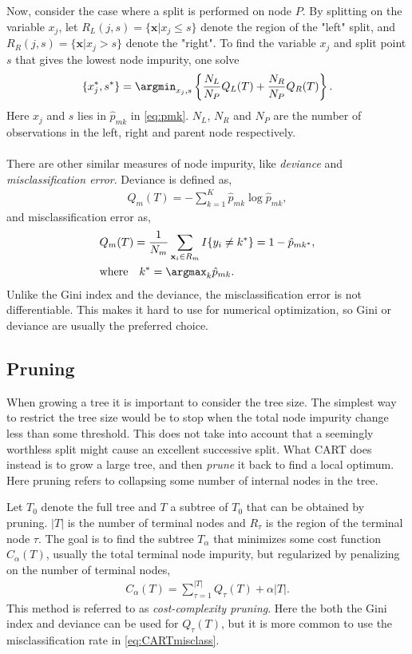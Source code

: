Now, consider the case where a split is performed on node $P$. By splitting on the variable $x_j$, let $R_L(j,s) = \{\mathbf{x} | x_j \leq s\}$ denote the region of the "left" split,  and $R_R(j,s) = \{\mathbf{x} | x_j > s\}$ denote the "right". To find the variable $x_j$ and split point $s$ that gives the lowest node impurity, one solve
\begin{align}
  \{x_j^*, s^*\} = \argmin_{x_j,s} \left\{ \frac{N_L}{N_P} Q_L(T)
  + \frac{N_R}{N_P} Q_R(T) \right\}.
\end{align}
Here $x_j$ and $s$ lies in $\hat{p}_{mk}$ in \eqref{eq:pmk}. $N_L$, $N_R$ and $N_P$ are the number of observations in the left, right and parent node respectively.
\\
\\
There are other similar measures of node impurity, like \textit{deviance} and \textit{misclassification error}. Deviance is defined as,
\begin{align}
  Q_m(T) = -  \sum^{K}_{k=1} \hat p_{m k} \log \hat p_{m k},
\end{align}
and misclassification error as,
\begin{align}
  \label{eq:CARTmisclass} 
  &Q_m(T) = \frac{1}{N_m} \sum_{\mathbf{x}_i \in R_m} I\{y_i \neq k^*\} = 1 - \hat p_{m k^*},\\
  &\text{where} \quad k^* = \argmax_k \hat p_{m k}. \notag
\end{align}
Unlike the Gini index and the deviance, the misclassification error is not differentiable. This makes it hard to use for numerical optimization, so Gini or deviance are usually the preferred choice. 

\subsection{Pruning}
\label{sub:Pruning}

When growing a tree it is important to consider the tree size. The simplest way to restrict the tree size would be to stop when the total node impurity change less than some threshold. This does not take into account that a seemingly worthless split might cause an excellent successive split. 
What CART does instead is to grow a large tree, and then \textit{prune} it back to find a local optimum. Here pruning refers to collapsing some number of internal nodes in the tree. 

Let $T_0$ denote the full tree and $T$ a subtree of $T_0$ that can be obtained by pruning. $|T|$ is the number of terminal nodes and $R_{\tau}$ is the region of the terminal node $\tau$. The goal is to find the subtree $T_\alpha$ that minimizes some cost function $C_\alpha (T)$, usually the total terminal node impurity, but regularized by penalizing on the number of terminal nodes,
\begin{align}
  \label{eq:CostPruning} 
  C_\alpha (T) = \sum_{\tau = 1}^{|T|} Q_\tau (T) + \alpha |T|. 
\end{align}
This method is referred to as \textit{cost-complexity pruning}.
Here the both the Gini index and deviance can be used for $Q_\tau (T)$, but it is more common to use the misclassification rate in \eqref{eq:CARTmisclass}. 

